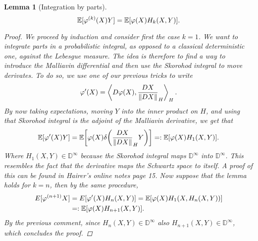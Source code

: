 \documentclass[12pt]{article}
\newtheorem{lemma}{Lemma}
\newcommand{\br}[1]{\left\langle#1\right\rangle}
\begin{document}
\begin{CJK*}{UTF8}{gbsn}
\begin{lemma}[Integration by parts]
		\begin{equation*}
			\mathbb{E}[\varphi^{(k)}(X)Y]=\mathbb{E}[\varphi(X)H_k(X,Y)].
		\end{equation*}
		\begin{proof}We proceed by induction and consider first the case $k=1$. We want to integrate parts in a probabilistic integral, as opposed to a classical deterministic one, against the Lebesgue measure. The idea is therefore to find a way to introduce the Malliavin differential and then use the Skorohod integral to move derivates. To do so, we use one of our previous tricks to write
			\begin{equation*}
				\varphi'(X)=\br{D\varphi(X),\frac{DX}{\norm{DX}}_{H}}_{H}.
			\end{equation*}
			By now taking expectations, moving $Y$ into the inner product on  $H$, and using that Skorohod integral is the adjoint of the Malliavin derivative, we get that
			\begin{equation*}
				\mathbb{E}[\varphi'(X)Y]=\mathbb{E}\qty[\varphi(X)\delta \qty(\frac{DX}{\norm{DX}}_{H}Y)]=:\mathbb{E}[\varphi(X)H_1(X,Y)].
			\end{equation*}
			Where  $H_1(X,Y)\in \mathbb{D}^\infty$ because the Skorohod integral maps $\mathbb{D}^\infty$ into $\mathbb{D}^\infty$. This resembles the fact that the derivative maps the Schwartz space to itself. A proof of this can be found in Hairer's online notes \cite{hairer2021introduction} page 15. Now suppose that the lemma  holds for $k=n$, then by the same procedure,
			\begin{align*}
				E[\varphi^{(n+1)}X] & =E[\varphi'(X) H_n(X,Y)]=\mathbb{E}[\varphi(X)H_1(X,H_n(X,Y))] \\&=:\mathbb{E}[\varphi(X)H_{n+1}(X,Y)].
			\end{align*}
			By the previous comment, since $H_n(X,Y)\in \mathbb{D}^\infty$ also $H_{n+1}(X,Y)\in \mathbb{D}^\infty$, which concludes the proof.
		\end{proof}


\end{lemma}
\end{CJK*}
\end{document}
